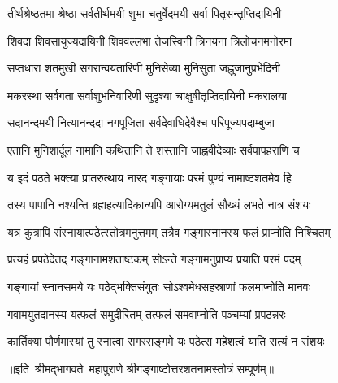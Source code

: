 \twolineshloka
{तीर्थश्रेष्ठतमा श्रेष्ठा सर्वतीर्थमयी शुभा}
{चतुर्वेदमयी सर्वा पितृसन्तृप्तिदायिनी}

\twolineshloka
{शिवदा शिवसायुज्यदायिनी शिववल्लभा}
{तेजस्विनी त्रिनयना त्रिलोचनमनोरमा}

\twolineshloka
{सप्तधारा शतमुखी सगरान्वयतारिणी}
{मुनिसेव्या मुनिसुता जह्नुजानुप्रभेदिनी}

\twolineshloka
{मकरस्था सर्वगता सर्वाशुभनिवारिणी}
{सुदृश्या चाक्षुषीतृप्तिदायिनी मकरालया}

\twolineshloka
{सदानन्दमयी नित्यानन्ददा नगपूजिता}
{सर्वदेवाधिदेवैश्च परिपूज्यपदाम्बुजा}

\twolineshloka
{एतानि मुनिशार्दूल नामानि कथितानि ते}
{शस्तानि जाह्नवीदेव्याः सर्वपापहराणि च}

\twolineshloka
{य इदं पठते भक्त्या प्रातरुत्थाय नारद}
{गङ्गायाः परमं पुण्यं नामाष्टशतमेव हि}

\twolineshloka
{तस्य पापानि नश्यन्ति ब्रह्महत्यादिकान्यपि}
{आरोग्यमतुलं सौख्यं लभते नात्र संशयः}

\twolineshloka
{यत्र कुत्रापि संस्नायात्पठेत्स्तोत्रमनुत्तमम्}
{तत्रैव गङ्गास्नानस्य फलं प्राप्नोति निश्चितम्}

\twolineshloka
{प्रत्यहं प्रपठेदेतद् गङ्गानामशताष्टकम्}
{सोऽन्ते गङ्गामनुप्राप्य प्रयाति परमं पदम्}

\twolineshloka
{गङ्गायां स्नानसमये यः पठेद्भक्तिसंयुतः}
{सोऽश्वमेधसहस्राणां फलमाप्नोति मानवः}

\twolineshloka
{गवामयुतदानस्य यत्फलं समुदीरितम्}
{तत्फलं समवाप्नोति पञ्चम्यां प्रपठन्नरः}

\twolineshloka
{कार्तिक्यां पौर्णमास्यां तु स्नात्वा सगरसङ्गमे}
{यः पठेत्स महेशत्वं याति सत्यं न संशयः}

{॥इति~श्रीमद्भागवते~महापुराणे श्रीगङ्गाष्टोत्तरशतनामस्तोत्रं सम्पूर्णम्॥}
\closesection